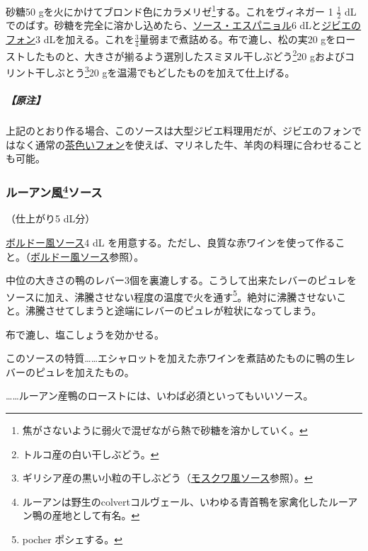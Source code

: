 \begin{recette}
砂糖50 gを火にかけてブロンド色にカラメリゼ\footnote{焦がさないように弱火で混ぜながら熱で砂糖を溶かしていく。}する。これをヴィネガー
1 \(\frac{1}{2}\)
dLでのばす。砂糖を完全に溶かし込めたら、\protect\hyperlink{sauce-espagnole}{ソース・エスパニョル}6
dLと\protect\hyperlink{fonds-de-gibier}{ジビエのフォン}3
dLを加える。これを\(\frac{3}{4}\)量弱まで煮詰める。布で漉し、松の実20
gをローストしたものと、大きさが揃るよう選別したスミヌル干しぶどう\footnote{トルコ産の白い干しぶどう。}20
gおよびコリント干しぶとう\footnote{ギリシア産の黒い小粒の干しぶどう（\protect\hyperlink{sauce-moscovite}{モスクワ風ソース}参照）。}20
gを温湯でもどしたものを加えて仕上げる。

\hypertarget{nota-sauce-romaine}{%
\subparagraph{【原注】}\label{nota-sauce-romaine}}

上記のとおり作る場合、このソースは大型ジビエ料理用だが、ジビエのフォンではなく通常の\protect\hyperlink{fonds-brun}{茶色いフォン}を使えば、マリネした牛、羊肉の料理に合わせることも可能。

\hypertarget{sauce-rouennaise}{%
\subsubsection[ルーアン風ソース]{\texorpdfstring{ルーアン風\footnote{ルーアンは野生のcolvertコルヴェール、いわゆる青首鴨を家禽化したルーアン鴨の産地として有名。}ソース}{ルーアン風ソース}}\label{sauce-rouennaise}}



（仕上がり5 dL分）

\protect\hyperlink{sauce-bordelaise}{ボルドー風ソース}4 dL
を用意する。ただし、良質な赤ワインを使って作ること。（\protect\hyperlink{sauce-bordelaise}{ボルドー風ソース}参照）。

中位の大きさの鴨のレバー3個を裏漉しする。こうして出来たレバーのピュレをソースに加え、沸騰させない程度の温度で火を通す\footnote{pocher
  ポシェする。}。絶対に沸騰させないこと。沸騰させてしまうと途端にレバーのピュレが粒状になってしまう。

布で漉し、塩こしょうを効かせる。

このソースの特質\ldots{}\ldots{}エシャロットを加えた赤ワインを煮詰めたものに鴨の生レバーのピュレを加えたもの。

\ldots{}\ldots{}ルーアン産鴨のローストには、いわば必須といってもいいソース。


\end{recette}
